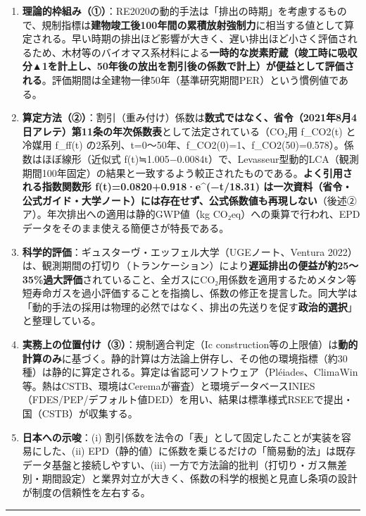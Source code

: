 \documentclass[11pt]{ltjsarticle}
\providecommand{\tightlist}{\setlength{\itemsep}{0pt}\setlength{\parskip}{0pt}}
\begin{document}
\begin{enumerate}
\def\labelenumi{\arabic{enumi}.}
\tightlist
\item
  \textbf{理論的枠組み（①）}：RE2020の動的手法は「排出の時期」を考慮するもので、規制指標は\textbf{建物竣工後100年間の累積放射強制力}に相当する値として算定される。早い時期の排出ほど影響が大きく、遅い排出ほど小さく評価されるため、木材等のバイオマス系材料による\textbf{一時的な炭素貯蔵（竣工時に吸収分▲1を計上し、50年後の放出を割引後の係数で計上）が便益として評価される}。評価期間は全建物一律50年（基準研究期間PER）という慣例値である。
\item
  \textbf{算定方法（②）}：割引（重み付け）係数は\textbf{数式ではなく、省令（2021年8月4日アレテ）第11条の年次係数表}として法定されている（CO₂用
  f\_CO2(t) と冷媒用 f\_ff(t)
  の2系列、t=0〜50年、f\_CO2(0)=1、f\_CO2(50)=0.578）。係数はほぼ線形（近似式
  f(t)≒1.005−0.0084t）で、Levasseur型動的LCA（観測期間100年固定）の結果と一致するよう較正されたものである。\textbf{よく引用される指数関数形
  f(t)=0.0820+0.918·e\^{}(−t/18.31)
  は一次資料（省令・公式ガイド・大学ノート）には存在せず、公式係数値も再現しない}（後述②ア）。年次排出への適用は静的GWP値（kg
  CO₂eq）への乗算で行われ、EPDデータをそのまま使える簡便さが特長である。
\item
  \textbf{科学的評価}：ギュスターヴ・エッフェル大学（UGEノート、Ventura
  2022）は、観測期間の打切り（トランケーション）により\textbf{遅延排出の便益が約25〜35\%過大評価}されていること、全ガスにCO₂用係数を適用するためメタン等短寿命ガスを過小評価することを指摘し、係数の修正を提言した。同大学は「動的手法の採用は物理的必然ではなく、排出の先送りを促す\textbf{政治的選択}」と整理している。
\item
  \textbf{実務上の位置付け（③）}：規制適合判定（Ic
  construction等の上限値）は\textbf{動的計算のみ}に基づく。静的計算は方法論上併存し、その他の環境指標（約30種）は静的に算定される。算定は省認可ソフトウェア（Pléiades、ClimaWin等。熱はCSTB、環境はCeremaが審査）と環境データベースINIES（FDES/PEP/デフォルト値DED）を用い、結果は標準様式RSEEで提出・国（CSTB）が収集する。
\item
  \textbf{日本への示唆}：(i)
  割引係数を法令の「表」として固定したことが実装を容易にした、(ii)
  EPD（静的値）に係数を乗じるだけの「簡易動的法」は既存データ基盤と接続しやすい、(iii)
  一方で方法論的批判（打切り・ガス無差別・期間設定）と業界対立が大きく、係数の科学的根拠と見直し条項の設計が制度の信頼性を左右する。
\end{enumerate}

\begin{center}\rule{0.5\linewidth}{0.5pt}\end{center}
\end{document}
